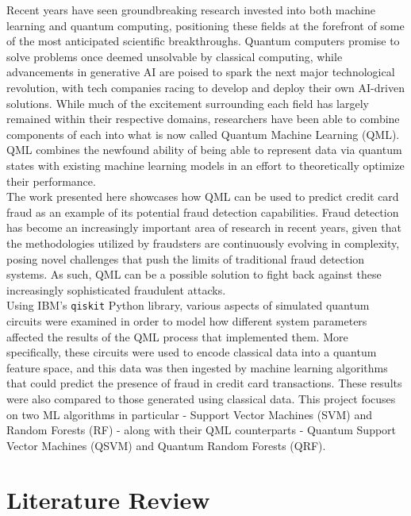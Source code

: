 \documentclass[11pt, oneside]{article}   	%
\begin{document}
\indent Recent years have seen groundbreaking research invested into both machine learning and quantum computing, positioning these fields at the forefront of some of the most anticipated scientific breakthroughs. Quantum computers promise to solve problems once deemed unsolvable by classical computing, while advancements in generative AI are poised to spark the next major technological revolution, with tech companies racing to develop and deploy their own AI-driven solutions. While much of the excitement surrounding each field has largely remained within their respective domains, researchers have been able to combine components of each into what is now called Quantum Machine Learning (QML). QML combines the newfound ability of being able to represent data via quantum states with existing machine learning models in an effort to theoretically optimize their performance.\\

The work presented here showcases how QML can be used to predict credit card fraud as an example of its potential fraud detection capabilities. Fraud detection has become an increasingly important area of research in recent years, given that the methodologies utilized by fraudsters are continuously evolving in complexity, posing novel challenges that push the limits of traditional fraud detection systems. As such, QML can be a possible solution to fight back against these increasingly sophisticated fraudulent attacks. \\

Using IBM’s \texttt{qiskit} Python library, various aspects of simulated quantum circuits were examined in order to model how different system parameters affected the results of the QML process that implemented them. More specifically, these circuits were used to encode classical data into a quantum feature space, and this data was then ingested by machine learning algorithms that could predict the presence of fraud in credit card transactions. These results were also compared to those generated using classical data. This project focuses on two ML algorithms in particular - Support Vector Machines (SVM) and Random Forests (RF) - along with their QML counterparts - Quantum Support Vector Machines (QSVM) and Quantum Random Forests (QRF). 




\section{Literature Review}
\end{document}
